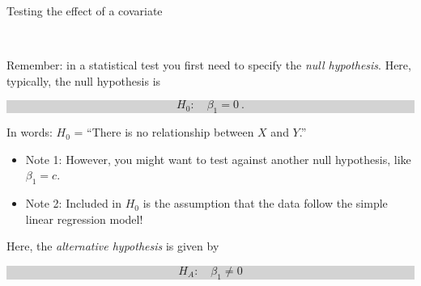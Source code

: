 \documentclass[10pt,ignorenonframetext,]{beamer}
\begin{document}
\begin{frame}

\begin{block}{Testing the effect of a covariate}

\(~\)

Remember: in a statistical test you first need to specify the \emph{null
hypothesis}. Here, typically, the null hypothesis is

\begin{center}
\colorbox{lightgray}{\begin{minipage}{6cm}
\vspace{-2mm}
$$H_0: \quad \beta_1 =   0  \ .$$

\end{minipage}}
\end{center}

In words: \(H_0\) = ``There is no relationship between \(X\) and
\(Y\).''

\vspace{2mm}

\begin{itemize}
\item
  Note 1: However, you might want to test against another null
  hypothesis, like \(\beta_1=c\).
\item
  Note 2: Included in \(H_0\) is the assumption that the data follow the
  simple linear regression model!
\end{itemize}

\vspace{6mm}

Here, the \emph{alternative hypothesis} is given by \(~\)

\begin{center}
\colorbox{lightgray}{\begin{minipage}{6cm}
$$H_A: \quad \beta_1 \neq  0  $$
\end{minipage}}
\end{center}

\end{block}

\end{frame}
\end{document}
